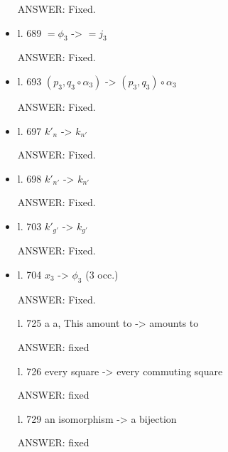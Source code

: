 \documentclass[english,11pt,a4paper]{article}
\begin{document}
\begin{itemize}
ANSWER: Fixed.

\item l. 689 $= \phi_3$ -> $= j_3$

ANSWER: Fixed.

\item l. 693 $(p_3, q_3 \circ \alpha_3)$ -> $(p_3, q_3) \circ \alpha_3$

ANSWER: Fixed.

\item l. 697 $ k'_n$ -> $k_{n'}$

ANSWER: Fixed.

\item l. 698 $k'_{n'}$ -> $k_{n'}$

ANSWER: Fixed.

\item l. 703 $k'_{g'}$ -> $k_{g'}$

ANSWER: Fixed.

\item l. 704 $x_3$ -> $\phi_3$ (3 occ.)

ANSWER: Fixed.

l. 725 a a, This amount to -> amounts to

ANSWER: fixed

l. 726 every square -> every commuting square

ANSWER: fixed

l. 729 an isomorphism -> a bijection

ANSWER: fixed
\end{itemize} 

	
	
\end{document}
